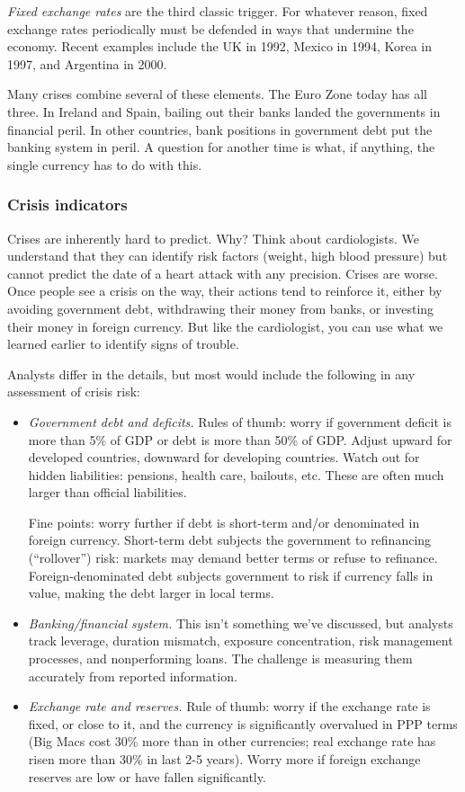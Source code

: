 \documentclass[letterpaper,12pt]{article}
\begin{document}
{\it Fixed exchange rates\/} are the third classic trigger.
For whatever reason, fixed exchange rates periodically
must be defended in ways that undermine the economy.
Recent examples include the UK in 1992,
Mexico in 1994,
Korea in 1997,
and Argentina in 2000.

Many crises combine several of these elements.
The Euro Zone today has all three.
In Ireland and Spain, bailing out their banks
landed the governments in financial peril.
In other countries, bank positions in government debt
put the banking system in peril.
A question for another time is what, if anything,
the single currency has to do with this.


\subsubsection*{Crisis indicators}

Crises are inherently hard to predict.
Why?
Think about cardiologists.
We understand that they can identify risk factors
(weight, high blood pressure) but cannot predict
the date of a heart attack with any precision.
Crises are worse.
Once people see a crisis on the way,
their actions tend to reinforce it,
either by avoiding government debt,
withdrawing their money from banks,
or investing their money in foreign currency.
But like the cardiologist, you can use what we learned earlier
to identify signs of trouble.


Analysts differ in the details, but most
would include the following in any assessment of crisis risk:
%
\begin{itemize}
\item {\it Government debt and deficits.\/}
Rules of thumb:  worry if government
deficit is more than 5\% of GDP or debt is more than 50\% of GDP.
Adjust upward for developed countries, downward for developing countries.
Watch out for hidden liabilities:  pensions, health care, bailouts, etc.
These are often much larger than official liabilities.

Fine points:  worry further if debt is short-term and/or denominated in foreign currency.
Short-term debt subjects the government to refinancing (``rollover'') risk:
 markets may demand better terms or refuse to refinance.  Foreign-denominated debt subjects government to risk
if currency falls in value, making the debt larger in local terms.

\item {\it Banking/financial system.\/}
This isn't something we've discussed,
but  analysts track leverage, duration mismatch, exposure concentration,
risk management processes,
and nonperforming loans.
The challenge is measuring them accurately from reported information.

\item {\it Exchange rate and reserves.\/}
Rule of thumb:  worry if the exchange rate is fixed, or close to it,
and the currency is significantly overvalued in PPP terms
(Big Macs cost 30\% more than in other currencies;
real exchange rate has risen more than 30\% in last 2-5 years).
Worry more if foreign exchange reserves
are low or have fallen significantly.
\end{itemize}
\end{document}
